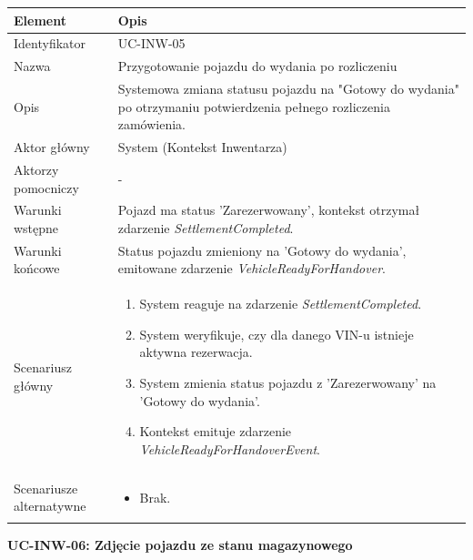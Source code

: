 \begin{longtable}{|p{4cm}|p{11cm}|}
\hline
\textbf{Element} & \textbf{Opis} \\
\hline

Identyfikator & UC-INW-05 \\
\hline

Nazwa & Przygotowanie pojazdu do wydania po rozliczeniu \\
\hline

Opis & 
Systemowa zmiana statusu pojazdu na "Gotowy do wydania" po otrzymaniu potwierdzenia pełnego rozliczenia zamówienia. \\
\hline

Aktor główny & System (Kontekst Inwentarza) \\
\hline

Aktorzy pomocniczy & - \\
\hline

Warunki wstępne & 
Pojazd ma status 'Zarezerwowany', kontekst otrzymał zdarzenie \textit{SettlementCompleted}. \\
\hline

Warunki końcowe & 
Status pojazdu zmieniony na 'Gotowy do wydania', emitowane zdarzenie \textit{VehicleReadyForHandover}. \\
\hline

Scenariusz główny & 
\begin{enumerate}
    \item System reaguje na zdarzenie \textit{SettlementCompleted}.
    \item System weryfikuje, czy dla danego VIN-u istnieje aktywna rezerwacja.
    \item System zmienia status pojazdu z 'Zarezerwowany' na 'Gotowy do wydania'.
    \item Kontekst emituje zdarzenie \textit{VehicleReadyForHandoverEvent}.
\end{enumerate} \\
\hline

Scenariusze alternatywne & 
\begin{itemize}
    \item [] Brak.
\end{itemize} \\
\hline
\end{longtable}

\textbf{UC-INW-06: Zdjęcie pojazdu ze stanu magazynowego}

